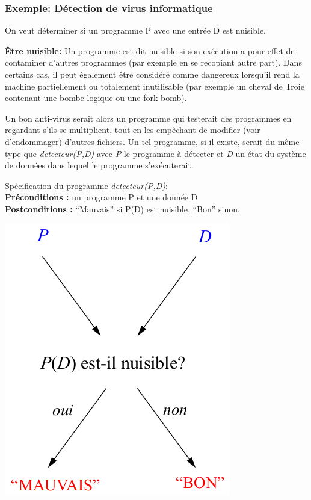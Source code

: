 
\subsubsection{Exemple: Détection de virus informatique}
\label{subsubsec:detection_de_virus_informatique}
On veut déterminer si un programme P avec une entrée D est nuisible.

\textbf{Être nuisible:} Un programme est dit nuisible si son exécution a pour effet de contaminer d'autres programmes (par exemple en se recopiant autre part). Dans certains cas, il peut également être considéré comme dangereux lorsqu'il rend la machine partiellement ou totalement inutilisable (par exemple un cheval de Troie contenant une bombe logique ou une fork bomb).

Un bon anti-virus serait alors un programme qui testerait des programmes en regardant s'ils se multiplient, tout en les empêchant de modifier (voir d'endommager) d'autres fichiers. Un tel programme, si il existe, serait du même type que \textit{detecteur(P,D)} avec \textit{P} le programme à détecter et \textit{D} un état du système de données dans lequel le programme s'exécuterait.

\noindent Spécification du programme \textit{detecteur(P,D)}:\\
\textbf{Préconditions :} un programme P et une donnée D\\
\textbf{Postconditions :} ``Mauvais'' si P(D) est nuisible,
		``Bon'' sinon.\\

\begin{center}
\includegraphics[scale=0.45]{Images/effet_detecteur.png}
\end{center}

